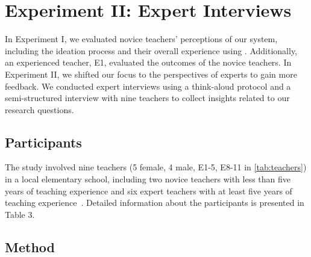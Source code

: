 \section{Experiment II: Expert Interviews} \label{sec:experiment_2}
In Experiment I, we evaluated novice teachers' perceptions of our system, including the ideation process and their overall experience using \name{}.
Additionally, an experienced teacher, E1, evaluated the outcomes of the novice teachers. In Experiment II, we shifted our focus to the perspectives of experts  to gain more feedback. %
We conducted expert interviews using a think-aloud protocol and a semi-structured interview with nine teachers to collect insights related to our research questions. 

\subsection{Participants}
The study involved nine  teachers (5 female, 4 male, E1-5, E8-11 in \autoref{tab:teachers}) in a local elementary school, 
including two novice teachers with less than five years of teaching experience and six expert teachers with at least five years of teaching experience~\cite{booth2021mid}.
Detailed information about the participants is presented in Table 3.


\subsection{Method}

